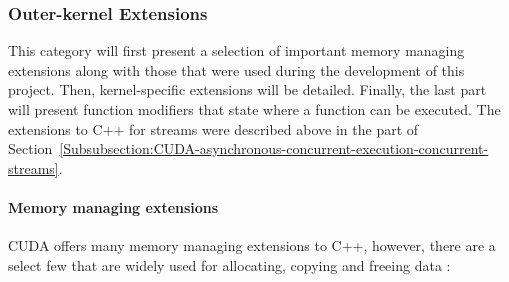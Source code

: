 \subsubsection{Outer-kernel Extensions}\label{Subsubsection:CUDA-C++-extensions-outer-kernel-extensions}
This category will first present a selection of important memory managing extensions along with those that were used during the development of this project. Then, kernel-specific extensions will be detailed. Finally, the last part will present function modifiers that state where a function can be executed. The extensions to C++ for streams were described above in the \textit{} part of Section~\ref{Subsubsection:CUDA-asynchronous-concurrent-execution-concurrent-streams}.

\paragraph{Memory managing extensions}\label{Paragraph:CUDA-C++-extensions-outer-kernel-extensions-memory-managing-extensions}
CUDA offers many memory managing extensions to C++, however, there are a select few that are widely used for allocating, copying and freeing data \cite{NVIDIAMay2022, NvidiaJanuary2022, Cejka2020}:

